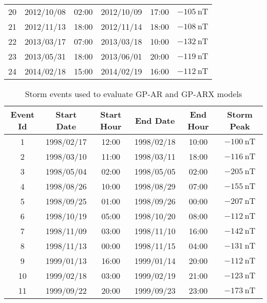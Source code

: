 \begin{table}[h]
\begin{tabular}{llllll}
    20 & 2012/10/08 & 02:00 & 2012/10/09 & 17:00 & $ \SI{-105}{\nano\tesla}$ \\
    21 & 2012/11/13 & 18:00 & 2012/11/14 & 18:00 & $ \SI{-108}{\nano\tesla}$ \\
    22 & 2013/03/17 & 07:00 & 2013/03/18 & 10:00 & $ \SI{-132}{\nano\tesla}$ \\
    23 & 2013/05/31 & 18:00 & 2013/06/01 & 20:00 & $ \SI{-119}{\nano\tesla}$ \\
    24 & 2014/02/18 & 15:00 & 2014/02/19 & 16:00 & $ \SI{-112}{\nano\tesla}$ \\ \hline
    \end{tabular}
    \end{table}
    
    

    \begin{table}[h]
    \centering
    \caption{Storm events used to evaluate GP-AR and GP-ARX models}
    \label{table:teststorms}
    \begin{adjustbox}{width=\textwidth,totalheight=0.9\textheight,keepaspectratio}
    \begin{tabular}{cccccc}
    \hline
    \textbf{Event Id} & \textbf{Start Date} & \textbf{Start Hour} & \textbf{End Date} & \textbf{End Hour} & \textbf{Storm Peak} \\ \hline
    1 & 1998/02/17 & 12:00 & 1998/02/18 & 10:00 & $ \SI{-100}{\nano\tesla}$ \\
    2 & 1998/03/10 & 11:00 & 1998/03/11 & 18:00 & $ \SI{-116}{\nano\tesla}$ \\
    3 & 1998/05/04 & 02:00 & 1998/05/05 & 02:00 & $ \SI{-205}{\nano\tesla}$ \\
    4 & 1998/08/26 & 10:00 & 1998/08/29 & 07:00 & $ \SI{-155}{\nano\tesla}$ \\
    5 & 1998/09/25 & 01:00 & 1998/09/26 & 00:00 & $ \SI{-207}{\nano\tesla}$ \\
    6 & 1998/10/19 & 05:00 & 1998/10/20 & 08:00 & $ \SI{-112}{\nano\tesla}$ \\
    7 & 1998/11/09 & 03:00 & 1998/11/10 & 16:00 & $ \SI{-142}{\nano\tesla}$ \\
    8 & 1998/11/13 & 00:00 & 1998/11/15 & 04:00 & $ \SI{-131}{\nano\tesla}$ \\
    9 & 1999/01/13 & 16:00 & 1999/01/14 & 20:00 & $ \SI{-112}{\nano\tesla}$ \\
    10 & 1999/02/18 & 03:00 & 1999/02/19 & 21:00 & $ \SI{-123}{\nano\tesla}$ \\
    11 & 1999/09/22 & 20:00 & 1999/09/23 & 23:00 & $ \SI{-173}{\nano\tesla}$ \\

\end{tabular}
\end{adjustbox}
\end{table}
